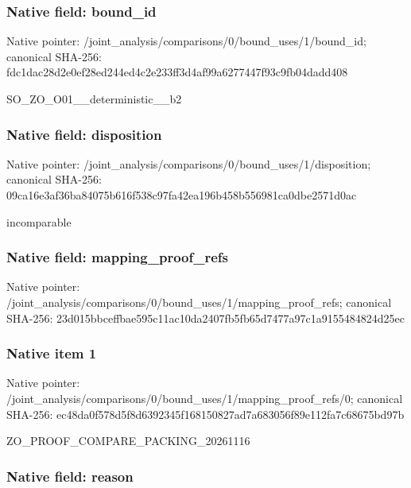 \documentclass[10pt,a4paper]{article}
\begin{document}
\subsubsection{Native field: bound\_id}


Native pointer: /joint\_analysis/comparis\allowbreak{}ons/0/bound\_uses/1/bound\allowbreak{}\_id; canonical SHA-256: fdc1dac28d2e0ef28ed244ed\allowbreak{}4c2e233ff3d4af99a6277447\allowbreak{}f93c9fb04dadd408


SO\_ZO\_O01\_\_deterministic\_\_b2


\subsubsection{Native field: disposition}


Native pointer: /joint\_analysis/comparis\allowbreak{}ons/0/bound\_uses/1/dispo\allowbreak{}sition; canonical SHA-256: 09ca16e3af36ba84075b616f\allowbreak{}538c97fa42ea196b458b5569\allowbreak{}81ca0dbe2571d0ac


incomparable


\subsubsection{Native field: mapping\_proof\_refs}


Native pointer: /joint\_analysis/comparis\allowbreak{}ons/0/bound\_uses/1/mappi\allowbreak{}ng\_proof\_refs; canonical SHA-256: 23d015bbceffbae595c11ac1\allowbreak{}0da2407fb5fb65d7477a97c1\allowbreak{}a9155484824d25ec



\subsubsection{Native item 1}


Native pointer: /joint\_analysis/comparis\allowbreak{}ons/0/bound\_uses/1/mappi\allowbreak{}ng\_proof\_refs/0; canonical SHA-256: ec48da0f578d5f8d6392345f\allowbreak{}168150827ad7a683056f89e1\allowbreak{}12fa7c68675bd97b


ZO\_PROOF\_COMPARE\_PACKING\_20261116


\subsubsection{Native field: reason}
\end{document}
